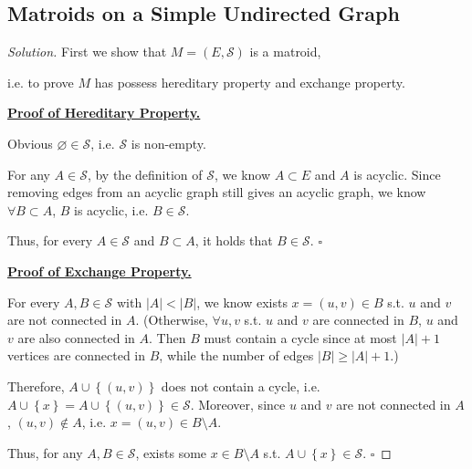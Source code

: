 \documentclass{article}
\newcommand{\whiteqed}{\hfill $\square$\par}
\newcommand{\set}[1]{\left\{#1\right\}}
\newenvironment{solution}{\begin{proof}[\noindent\it Solution]}{\end{proof}}
\begin{document}
\vspace{1em}
\subsection{Matroids on a Simple Undirected Graph}
\vspace{1em}
\begin{solution}
    First we show that $M=(E,\mathcal{S})$ is a matroid, 
    
    \hspace{2.6em}
    i.e. to prove $M$ has possess hereditary property and exchange property.
    
    \vspace{1em} \hspace{-2em}
    \underline{\textbf{Proof of Hereditary Property.}}
    
    \hspace{2.6em}
    Obvious $\varnothing\in\mathcal{S}$, i.e. $\mathcal{S}$ is non-empty.
    
    \hspace{2.6em}
    For any $A\in\mathcal{S}$, by the definition of $\mathcal{S}$, we know $A\subset E$ and $A$ is acyclic. Since removing edges from an acyclic graph still gives an acyclic graph, we know $\forall B\subset A$, $B$ is acyclic, i.e. $B\in\mathcal{S}$.
    
    \hspace{2.6em}
    Thus, for every $A\in\mathcal{S}$ and $B\subset A$, it holds that $B\in\mathcal{S}$. \whiteqed
    
    \vspace{1em} \hspace{-2em}
    \underline{\textbf{Proof of Exchange Property.}}
    
    \hspace{2.6em}
    For every $A,B\in\mathcal{S}$ with $|A|<|B|$, we know exists $x=(u,v)\in B$ s.t. $u$ and $v$ are not connected in $A$. (Otherwise, $\forall u,v$ s.t. $u$ and $v$ are connected in $B$, $u$ and $v$ are also connected in $A$. Then $B$ must contain a cycle since at most $|A|+1$ vertices are connected in $B$, while the number of edges $|B|\geq|A|+1$.)
    
    \hspace{2.6em}
    Therefore, $A\cup\set{(u,v)}$ does not contain a cycle, i.e. $A\cup\set{x}=A\cup\set{(u,v)}\in\mathcal{S}$. Moreover, since $u$ and $v$ are not connected in $A$, $(u,v)\notin A$, i.e. $x=(u,v)\in B\setminus A$.
    
    \hspace{2.6em}
    Thus, for any $A,B\in\mathcal{S}$, exists some $x\in B\setminus A$ s.t. $A\cup\set{x}\in\mathcal{S}$. \whiteqed
    

\end{solution}
\end{document}
